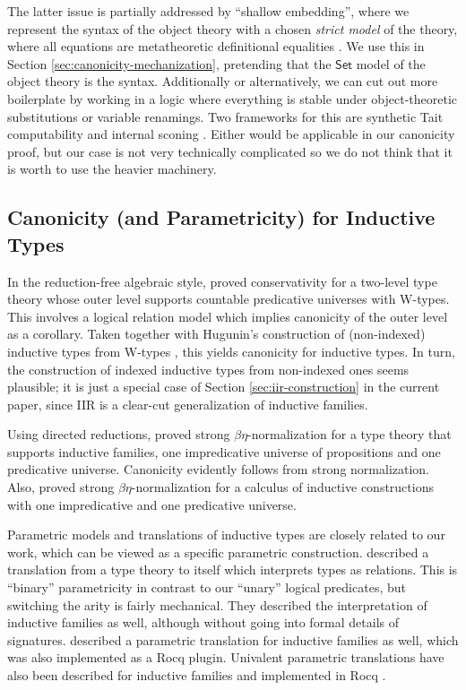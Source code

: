\documentclass[acmsmall,screen,review,anonymous]{acmart}
\newcommand{\msf}[1]{{\mathsf{#1}}}
\newcommand{\Set}{\msf{Set}}
\begin{document}
The latter issue is partially addressed by ``shallow embedding'', where we represent the syntax of
the object theory with a chosen \emph{strict model} of the theory, where all equations are
metatheoretic definitional equalities \cite{DBLP:conf/mpc/KaposiKK19}. We use this in Section
\ref{sec:canonicity-mechanization}, pretending that the $\Set$ model of the object theory is the
syntax. Additionally or alternatively, we can cut out more boilerplate by working in a logic where
everything is stable under object-theoretic substitutions or variable renamings. Two frameworks for
this are synthetic Tait computability \cite{sterlingthesis} and internal sconing
\cite{DBLP:conf/fscd/BocquetKS23}. Either would be applicable in our canonicity proof, but our case
is not very technically complicated so we do not think that it is worth to use the heavier machinery.

\subsection{Canonicity (and Parametricity) for Inductive Types}

In the reduction-free algebraic style, \citet{DBLP:journals/pacmpl/Kovacs24} proved conservativity
for a two-level type theory whose outer level supports countable predicative universes with
W-types. This involves a logical relation model which implies canonicity of the outer level as a
corollary. Taken together with Hugunin's construction of (non-indexed) inductive types from W-types
\cite{whynotw}, this yields canonicity for inductive types. In turn, the construction of
indexed inductive types from non-indexed ones seems plausible; it is just a special case of
Section \ref{sec:iir-construction} in the current paper, since IIR is a clear-cut generalization
of inductive families.

Using directed reductions, \citet{DBLP:phd/ethos/Goguen94} proved strong $\beta\eta$-normalization
for a type theory that supports inductive families, one impredicative universe of propositions and one
predicative universe. Canonicity evidently follows from strong normalization. Also,
\cite{DBLP:phd/hal/Werner94} proved strong $\beta\eta$-normalization for a calculus of inductive
constructions with one impredicative and one predicative universe.

Parametric models and translations of inductive types are closely related to our work, which can be
viewed as a specific parametric construction. \citet{bernardy12parametricity} described a
translation from a type theory to itself which interprets types as relations. This is ``binary''
parametricity in contrast to our ``unary'' logical predicates, but switching the arity is fairly
mechanical. They described the interpretation of inductive families as well, although without going
into formal details of signatures. \citet{pedrot2018failure} described a parametric translation for
inductive families as well, which was also implemented as a Rocq plugin. Univalent parametric
translations have also been described for inductive families and implemented in Rocq
\cite{tabareau2018equivalences,tabareau2021marriage,cohen2024trocq}.
\end{document}
